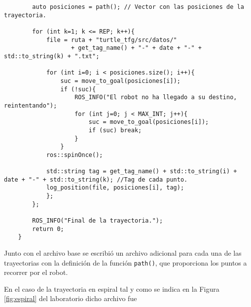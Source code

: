 \begin{lstlisting}
        auto posiciones = path(); // Vector con las posiciones de la trayectoria.
        
        for (int k=1; k <= REP; k++){
            file = ruta + "turtle_tfg/src/datos/" 
                   + get_tag_name() + "-" + date + "-" + std::to_string(k) + ".txt"; 
    
            for (int i=0; i < posiciones.size(); i++){
                suc = move_to_goal(posiciones[i]);
                if (!suc){
                    ROS_INFO("El robot no ha llegado a su destino, reintentando");
                    for (int j=0; j < MAX_INT; j++){
                        suc = move_to_goal(posiciones[i]);
                        if (suc) break;
                    }
                }
            ros::spinOnce();
    
            std::string tag = get_tag_name() + std::to_string(i) + date + "-" + std::to_string(k); //Tag de cada punto.
            log_position(file, posiciones[i], tag);
            };
        };
    
        ROS_INFO("Final de la trayectoria.");
        return 0;
    }

\end{lstlisting}

Junto con el archivo base se escribió un archivo adicional para cada una de las trayectorias con la definición de la función \texttt{path()}, que proporciona los puntos a recorrer por el robot.

En el caso de la trayectoria en espiral tal y como se indica en la Figura \ref{fig:espiral} del laboratorio dicho archivo fue

